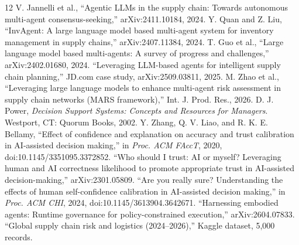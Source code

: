 \documentclass[conference]{IEEEtran}
\begin{document}
\begin{thebibliography}{12}
 V. Jannelli et al., ``Agentic LLMs in the supply chain: Towards autonomous multi-agent consensus-seeking,'' arXiv:2411.10184, 2024.
 Y. Quan and Z. Liu, ``InvAgent: A large language model based multi-agent system for inventory management in supply chains,'' arXiv:2407.11384, 2024.
 T. Guo et al., ``Large language model based multi-agents: A survey of progress and challenges,'' arXiv:2402.01680, 2024.
 ``Leveraging LLM-based agents for intelligent supply chain planning,'' JD.com case study, arXiv:2509.03811, 2025.
 M. Zhao et al., ``Leveraging large language models to enhance multi-agent risk assessment in supply chain networks (MARS framework),'' Int. J. Prod. Res., 2026.
 D. J. Power, \emph{Decision Support Systems: Concepts and Resources for Managers}. Westport, CT: Quorum Books, 2002.
 Y. Zhang, Q. V. Liao, and R. K. E. Bellamy, ``Effect of confidence and explanation on accuracy and trust calibration in AI-assisted decision making,'' in \emph{Proc. ACM FAccT}, 2020, doi:10.1145/3351095.3372852.
 ``Who should I trust: AI or myself? Leveraging human and AI correctness likelihood to promote appropriate trust in AI-assisted decision-making,'' arXiv:2301.05809.
 ``Are you really sure? Understanding the effects of human self-confidence calibration in AI-assisted decision making,'' in \emph{Proc. ACM CHI}, 2024, doi:10.1145/3613904.3642671.
 ``Harnessing embodied agents: Runtime governance for policy-constrained execution,'' arXiv:2604.07833.
 ``Global supply chain risk and logistics (2024--2026),'' Kaggle dataset, 5,000 records.
\end{thebibliography}
\end{document}
